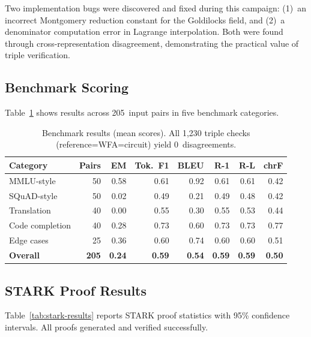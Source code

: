 \documentclass[11pt]{article}
\begin{document}
Two implementation bugs were discovered and fixed during this campaign:
(1)~an incorrect Montgomery reduction constant for the Goldilocks field,
and (2)~a denominator computation error in Lagrange interpolation.
Both were found through cross-representation disagreement, demonstrating
the practical value of triple verification.

\subsection{Benchmark Scoring}

Table~\ref{tab:benchmark} shows results across 205~input pairs in
five benchmark categories.

\begin{table}[t]
\centering
\caption{Benchmark results (mean scores). All 1{,}230 triple checks
  (reference=WFA=circuit) yield 0~disagreements.}
\label{tab:benchmark}
\smallskip
\begin{tabular}{@{}lrrrrrrr@{}}
\toprule
\textbf{Category} & \textbf{Pairs} & \textbf{EM} & \textbf{Tok.\ F1} &
  \textbf{BLEU} & \textbf{R-1} & \textbf{R-L} & \textbf{chrF} \\
\midrule
MMLU-style      & 50  & 0.58  & 0.61  & 0.92  & 0.61  & 0.61  & 0.42 \\
SQuAD-style     & 50  & 0.02  & 0.49  & 0.21  & 0.49  & 0.48  & 0.42 \\
Translation     & 40  & 0.00  & 0.55  & 0.30  & 0.55  & 0.53  & 0.44 \\
Code completion & 40  & 0.28  & 0.73  & 0.60  & 0.73  & 0.73  & 0.77 \\
Edge cases      & 25  & 0.36  & 0.60  & 0.74  & 0.60  & 0.60  & 0.51 \\
\midrule
\textbf{Overall}& \textbf{205} & \textbf{0.24} & \textbf{0.59} &
  \textbf{0.54} & \textbf{0.59} & \textbf{0.59} & \textbf{0.50} \\
\bottomrule
\end{tabular}
\end{table}


\subsection{STARK Proof Results}

Table~\ref{tab:stark-results} reports STARK proof statistics with
95\% confidence intervals.
All proofs generated and verified successfully.
\end{document}
